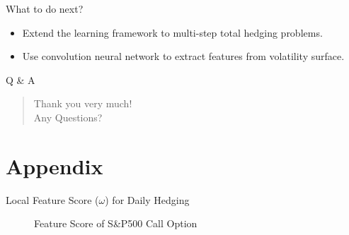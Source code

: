 \documentclass[10pt,table,mathserif]{beamer}
\begin{document}
\begin{frame}[fragile]{What to do next?}
\begin{itemize}
  \item Extend the learning framework to multi-step total hedging problems.
  \item Use convolution neural network to extract features from volatility surface.
\end{itemize}
\end{frame}


\begin{frame}{Q \& A}
  \LARGE
  \begin{quote}
    \alert{Thank you very much!}\\
    \hspace{8ex} Any Questions?
  \end{quote}
\end{frame}


\section{Appendix}
\begin{frame}[fragile]{Local Feature Score ($\omega$) for Daily Hedging}
\begin{figure}[htp]
  \centering
  \caption{Feature Score of S\&P500 Call Option } \label{fig:call1}
\end{figure}
\end{frame}
\end{document}
